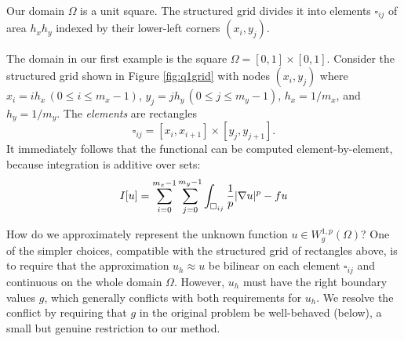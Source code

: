 \begin{marginfigure}
\caption{Our domain $\Omega$ is a unit square.  The structured grid divides it into elements $\square_{ij}$ of area $h_x h_y$ indexed by their lower-left corners $(x_i,y_j)$.}
\label{fig:q1grid}
\end{marginfigure}

The domain in our first example is the square $\Omega = [0,1]\times[0,1]$.  Consider the structured grid shown in Figure \ref{fig:q1grid} with nodes $(x_i,y_j)$ where $x_i = i h_x \, (0 \le i \le m_x-1)$, $y_j = j h_y \, (0 \le j \le m_y-1)$, $h_x=1/m_x$, and $h_y=1/m_y$.  The \emph{elements} are rectangles
   $$\square_{ij} = [x_i,x_{i+1}] \times [y_j,y_{j+1}].$$
It immediately follows that the functional can be computed element-by-element, because integration is additive over sets:
\begin{equation}
I[u] = \sum_{i=0}^{m_x-1} \sum_{j=0}^{m_y-1} \int_{\square_{ij}} \frac{1}{p} |\nabla u|^p - fu  \label{eq:of:sumoverelements}
\end{equation}

How do we approximately represent the unknown function $u \in W_g^{1,p}(\Omega)$?  One of the simpler choices, compatible with the structured grid of rectangles above, is to require that the approximation $u_h \approx u$ be bilinear on each element $\square_{ij}$ and continuous on the whole domain $\Omega$.  However, $u_h$ must have the right boundary values $g$, which generally conflicts with both requirements for $u_h$.  We resolve the conflict by requiring that $g$ in the original problem be well-behaved (below), a small but genuine restriction to our method.

